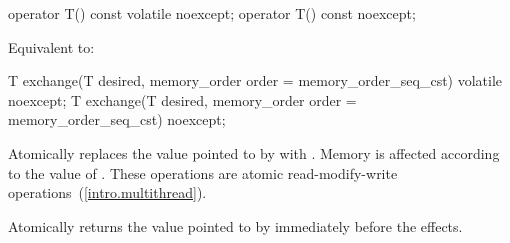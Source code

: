 %
%
%
\begin{itemdecl}
operator T() const volatile noexcept;
operator T() const noexcept;
\end{itemdecl}

\begin{itemdescr}
\pnum
\effects Equivalent to: 
\end{itemdescr}


%
%
%
%
%
\begin{itemdecl}
T exchange(T desired, memory_order order = memory_order_seq_cst) volatile noexcept;
T exchange(T desired, memory_order order = memory_order_seq_cst) noexcept;
\end{itemdecl}

\begin{itemdescr}
\pnum
\effects Atomically replaces the value pointed to by 
with .
Memory is affected according to the value of .
These operations are atomic read-modify-write operations~(\ref{intro.multithread}).

\pnum
\returns Atomically returns the value pointed to by  immediately before the effects.
\end{itemdescr}

